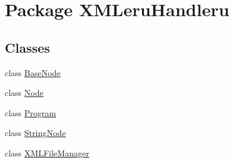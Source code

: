 \hypertarget{namespace_x_m_leru_handleru}{}\section{Package X\+M\+Leru\+Handleru}
\label{namespace_x_m_leru_handleru}
\subsection*{Classes}
\begin{DoxyCompactItemize}
\item 
class \hyperlink{class_x_m_leru_handleru_1_1_base_node}{Base\+Node}
\item 
class \hyperlink{class_x_m_leru_handleru_1_1_node}{Node}
\item 
class \hyperlink{class_x_m_leru_handleru_1_1_program}{Program}
\item 
class \hyperlink{class_x_m_leru_handleru_1_1_string_node}{String\+Node}
\item 
class \hyperlink{class_x_m_leru_handleru_1_1_x_m_l_file_manager}{X\+M\+L\+File\+Manager}
\end{DoxyCompactItemize}
